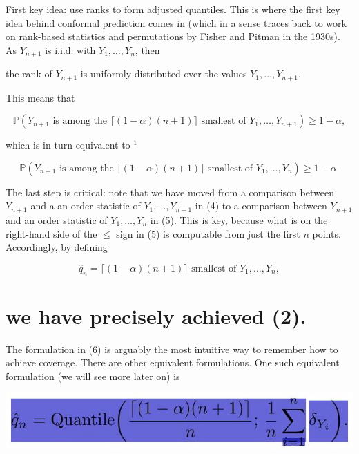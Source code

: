 \documentclass[10pt]{article}
\begin{document}
First key idea: use ranks to form adjusted quantiles. This is where the first key idea behind conformal prediction comes in (which in a sense traces back to work on rank-based statistics and permutations by Fisher and Pitman in the 1930s). As $Y_{n+1}$ is i.i.d. with $Y_{1}, \ldots, Y_{n}$, then

the rank of $Y_{n+1}$ is uniformly distributed over the values $Y_{1}, \ldots, Y_{n+1}$.

This means that

$$
\mathbb{P}\left(Y_{n+1} \text { is among the }\lceil(1-\alpha)(n+1)\rceil \text { smallest of } Y_{1}, \ldots, Y_{n+1}\right) \geq 1-\alpha,
$$

which is in turn equivalent to ${ }^{1}$

$$
\mathbb{P}\left(Y_{n+1} \text { is among the }\lceil(1-\alpha)(n+1)\rceil \text { smallest of } Y_{1}, \ldots, Y_{n}\right) \geq 1-\alpha .
$$

The last step is critical: note that we have moved from a comparison between $Y_{n+1}$ and a an order statistic of $Y_{1}, \ldots, Y_{n+1}$ in (4) to a comparison between $Y_{n+1}$ and an order statistic of $Y_{1}, \ldots, Y_{n}$ in (5). This is key, because what is on the right-hand side of the $\leq$ sign in (5) is computable from just the first $n$ points. Accordingly, by defining

$$
\hat{q}_{n}=\lceil(1-\alpha)(n+1)\rceil \text { smallest of } Y_{1}, \ldots, Y_{n},
$$

\section{we have precisely achieved (2).}
The formulation in (6) is arguably the most intuitive way to remember how to achieve coverage. There are other equivalent formulations. One such equivalent formulation (we will see more later on) is

\begin{center}
\includegraphics[max width=\textwidth]{2023_10_05_3f4b7f0ae8e12ec8ac84g-02(2)}
\end{center}
\end{document}
